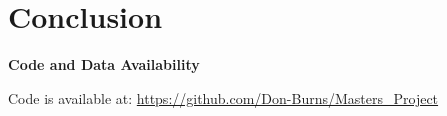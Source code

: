 \documentclass[a4paper, 11pt, hidelinks]{article} %
\begin{document}
	
	\nolinenumbers


\section{Conclusion}
	\linenumbers
	
	
	
	\nolinenumbers
	
	\textbf{Code and Data Availability}

	Code is available at: \url{https://github.com/Don-Burns/Masters_Project}
	
	
	\newpage
	\linenumbers
	
	
	\printbibliography
	
	\nolinenumbers
	
	
	\newpage
	
	
	
\end{document}
